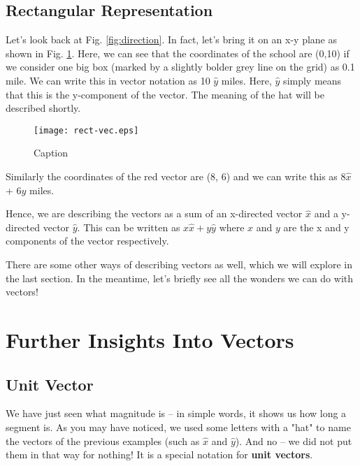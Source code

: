 \subsection{Rectangular Representation}
Let's look back at Fig. \ref{fig:direction}. In fact, let's bring it on an x-y plane as shown in Fig. \ref{fig:rect-vec}. Here, we can see that the coordinates of the school are (0,10) if we consider one big box (marked by a slightly bolder grey line on the grid) as 0.1 mile. We can write this in vector notation as 10 $\hat{y}$ miles. Here, $\hat{y}$ simply means that this is the y-component of the vector. The meaning of the hat will be described shortly.

\begin{figure}[!ht]
    \centering
    \texttt{[image: rect-vec.eps]}
    \caption{Caption}
    \label{fig:rect-vec}
\end{figure}

Similarly the coordinates of the red vector are (8, 6) and we can write this as 8$\hat{x}$ + 6$\hat{y}$ miles. 

Hence, we are describing the vectors as a sum of an x-directed vector $\hat{x}$ and a y-directed vector $\hat{y}$. This can be written as $x \hat{x} + y\hat{y}$ where $x$ and $y$ are the x and y components of the vector respectively. 

There are some other ways of describing vectors as well, which we will explore in the last section. In the meantime, let's briefly see all the wonders we can do with vectors!

\section{Further Insights Into Vectors}
\subsection{Unit Vector}
We have just seen what magnitude is -- in simple words, it shows us how long a segment is. As you may have noticed, we used some letters with a "hat" to name the vectors of the previous examples (such as $\hat{x}$ and $\hat{y}$). And no -- we did not put them in that way for nothing! It is a special notation for \textbf{unit vectors}.

